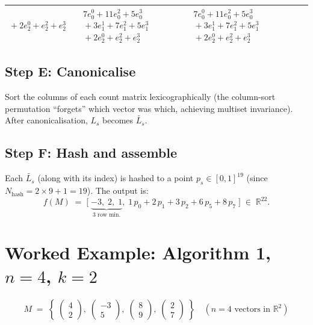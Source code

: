 \documentclass[11pt,a4paper]{article}
\newcommand{\eji}[2]{e^{#1}_{#2}}       %
\newcommand{\canon}[1]{\widetilde{#1}}  %
\newcommand{\R}{\mathbb{R}}
\begin{document}
\begin{center}
\begin{tabular}{c|cp{3cm}|cp{3cm}|cp{3cm}}
    ${}+2\eji{0}{2}+\eji{2}{2}+\eji{3}{2}$
  &
  &
  $7\eji{0}{0}+11\eji{2}{0}+5\eji{3}{0}$\newline
    ${}+3\eji{1}{1}+7\eji{2}{1}+5\eji{3}{1}$\newline
    ${}+2\eji{0}{2}+\eji{2}{2}+\eji{3}{2}$
  &
  & $7\eji{0}{0}+11\eji{2}{0}+5\eji{3}{0}$\newline
    ${}+3\eji{1}{1}+7\eji{2}{1}+5\eji{3}{1}$\newline
    ${}+2\eji{0}{2}+\eji{2}{2}+\eji{3}{2}$
  \\
\bottomrule
\end{tabular}
\end{center}

\subsection*{Step E: Canonicalise}

Sort the columns of each count matrix lexicographically (the column-sort
permutation ``forgets'' which vector was which, achieving multiset invariance).
After canonicalisation, $L_s$ becomes $\canon{L_s}$.

\subsection*{Step F: Hash and assemble}

Each $\canon{L_s}$ (along with its index) is hashed to a point $p_s \in
[0,1]^{19}$ (since $N_{\text{hash}} = 2{\times}9{+}1 = 19$).
The output is:
\[
  f(M) \;=\;
  \bigl[\;\underbrace{-3,\;2,\;1}_{3\text{ row min.}},\;
          1\,p_0 + 2\,p_1 + 3\,p_2 + 6\,p_5 + 8\,p_7\;\bigr]
  \;\in\; \R^{22}.
\]

\section{Worked Example: Algorithm 1, $n=4$, $k=2$}
\label{sec:example-alg1}

\[
  M \;=\; \left\{\;
    \begin{pmatrix}4\\2\end{pmatrix},\;
    \begin{pmatrix}-3\\5\end{pmatrix},\;
    \begin{pmatrix}8\\9\end{pmatrix},\;
    \begin{pmatrix}2\\7\end{pmatrix}
  \;\right\}
  \quad (n=4 \text{ vectors in } \R^2)
\]
\end{document}
